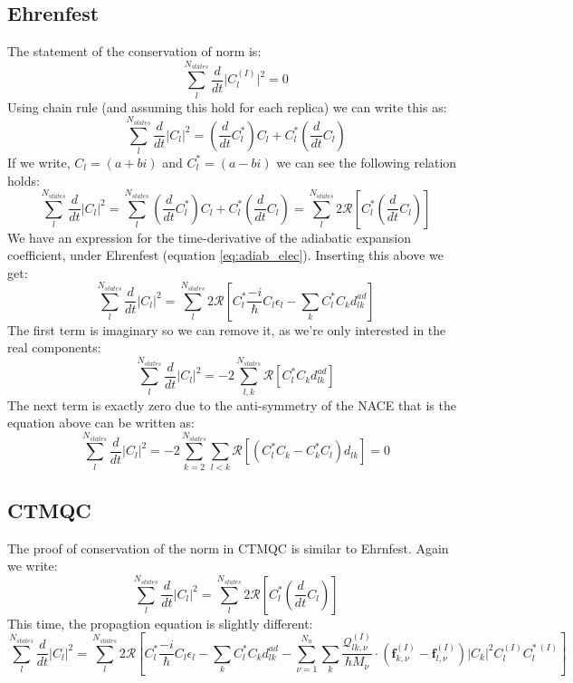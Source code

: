 \subsection{Ehrenfest \label{ap:Norm_Pres_Eh}}
The statement of the conservation of norm is:
\[ \sum_{l}^{N_{states}} \frac{d}{dt} \vert C_{l}^{(I)} \vert^2 = 0\]
Using chain rule (and assuming this hold for each replica) we can write this as:
\[\sum_{l}^{N_{states}} \frac{d}{dt} \vert C_{l} \vert^2 = \left(\frac{d}{dt} C_{l}^{*}\right)C_{l} + C_{l}^*\left(\frac{d}{dt} C_{l}\right)\]
If we write, $C_l = (a + bi)$ and $C_l^* = (a - bi)$ we can see the following relation holds:
\[\sum_{l}^{N_{states}} \frac{d}{dt} \vert C_{l} \vert^2 = \sum_{l}^{N_{states}} \left(\frac{d}{dt} C_{l}^{*}\right)C_{l} + C_{l}^*\left(\frac{d}{dt} C_{l}\right) = \sum_{l}^{N_{states}} 2\mathcal{R} \left[ C_{l}^*\left(\frac{d}{dt} C_{l}\right) \right]\]
We have an expression for the time-derivative of the adiabatic expansion coefficient, under Ehrenfest (equation \eqref{eq:adiab_elec}). Inserting this above we get:
\[\sum_{l}^{N_{states}} \frac{d}{dt} \vert C_{l} \vert^2 = \sum_{l}^{N_{states}}2 \mathcal{R}\left[ C_{l}^* \frac{-i}{\hbar} C_{l} \epsilon_{l} - \sum_{k} C_{l}^{*} C_{k} d_{lk}^{ad} \right]\]
The first term is imaginary so we can remove it, as we're only interested in the real components:
\[\sum_{l}^{N_{states}} \frac{d}{dt} \vert C_{l} \vert^2 = - 2 \sum_{l,k}^{N_{states}} \mathcal{R}\left[  C_{l}^{*} C_{k} d_{lk}^{ad} \right]\]
The next term is exactly zero due to the anti-symmetry of the NACE that is the equation above can be written as:
\[\sum_{l}^{N_{states}} \frac{d}{dt} \vert C_{l} \vert^2 = -2 \sum_{k=2}^{N_{states}} \sum_{l<k} \mathcal{R}\left[(C_{l}^{*}C_{k} - C_{k}^{*}C_{l})d_{lk}\right] = 0\]

\subsection{CTMQC \label{ap:CTMQC}}
The proof of conservation of the norm in CTMQC is similar to Ehrnfest. Again we write:
\[\sum_{l}^{N_{states}} \frac{d}{dt} \vert C_{l} \vert^2 = \sum_{l}^{N_{states}} 2\mathcal{R} \left[ C_{l}^*\left(\frac{d}{dt} C_{l}\right) \right]\]
This time, the propagtion equation is slightly different:
\[\sum_{l}^{N_{states}} \frac{d}{dt} \vert C_{l} \vert^2 = \sum_{l}^{N_{states}}2 \mathcal{R}\left[ C_{l}^* \frac{-i}{\hbar} C_{l} \epsilon_{l} - \sum_{k} C_{l}^{*} C_{k} d_{lk}^{ad} - \sum_{\nu=1}^{N_n}\sum_{k}\frac{\mathcal{Q}_{lk,\nu}^{(I)}}{\hbar M_{\nu}}\cdot \left(\textbf{f}_{k,\nu}^{(I)} - \textbf{f}_{l,\nu}^{(I)}\right)|C_k|^2 C_l^{(I)}C_l^{* \ (I)} \right]\]


